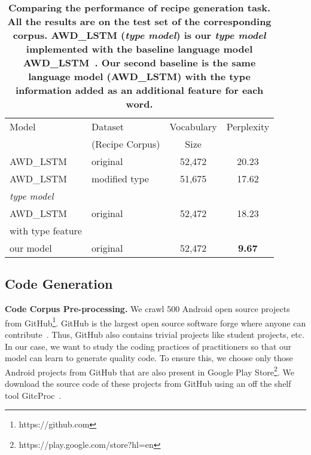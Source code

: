 \documentclass[11pt,a4paper]{article}
\begin{document}
\begin{table}
\scriptsize
\centering

 \begin{tabular}{l| l| c |  c} 
 \toprule
 Model & Dataset  & Vocabulary & Perplexity   \\ 
       & (Recipe Corpus)  & Size &    \\ 
 \midrule
  AWD\_LSTM & original  & 52,472  & 20.23 \\
   \midrule
  AWD\_LSTM  & modified type  &  51,675 & 17.62 \\
  \textit{type model} & & & \\
   \midrule
AWD\_LSTM  & original  &  52,472 & 18.23\\
   with type feature & & & \\
    \midrule
 our model  & original  &  52,472 &  \textbf{9.67} \\
 \bottomrule
 \end{tabular}
 \caption{\textbf{\small Comparing the performance of recipe generation task. All the results are on the test set of the corresponding corpus. AWD\_LSTM (\textit{type model}) is our \textit{type model} implemented with the baseline language model AWD\_LSTM~\cite{socher}. Our second baseline is the same language model (AWD\_LSTM) with the type information added as an additional feature for each word.}}


 \label{rcp_ppl_table}
\end{table}
\subsection{Code Generation}
\label{code}

\textbf{Code Corpus Pre-processing.} We crawl 500 Android open source projects from GitHub\footnote{https://github.com}. 
GitHub is the largest open source software forge where anyone can contribute~\cite{ray2014large}. Thus, GitHub also contains trivial projects like student projects, etc. In our case, we want to study the coding practices of practitioners so that our model can learn to generate quality code. To ensure this, we choose only those Android projects from GitHub that are also present in Google Play Store\footnote{https://play.google.com/store?hl=en}. We download the source code of these projects from GitHub using an off the shelf tool GitcProc~\cite{casalnuovo2017gitcproc}.
\end{document}
